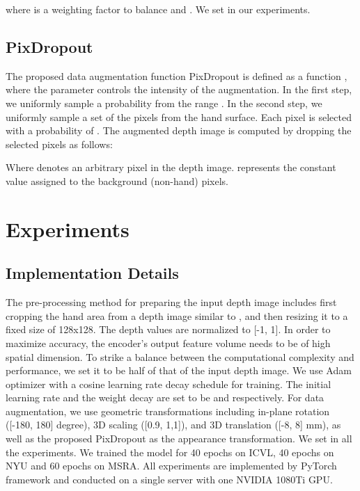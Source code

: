 \documentclass{article}
\begin{document}
where  is a weighting factor to balance  and . We set   in our experiments.

\subsection{PixDropout}
The proposed data augmentation function PixDropout is defined as a function , where the parameter  controls the intensity of the augmentation. In the first step, we uniformly sample a probability  from the range . In the second step, we uniformly sample a set of the pixels  from the hand surface. Each pixel is selected with a probability of . The augmented depth image  is computed by dropping the selected pixels as follows: 

Where  denotes an arbitrary pixel in the depth image.   represents the constant value assigned to the background (non-hand) pixels. 

\section{Experiments}
\subsection{Implementation Details}
The pre-processing method for preparing the input depth image includes first cropping the hand area from a depth image similar to \cite{oberweger2017deepprior++}, and then resizing it to a fixed size of 128x128. The depth values are normalized to [-1, 1]. In order to maximize accuracy, the encoder's output feature volume needs to be of high spatial dimension. To strike a balance between the computational complexity and performance, we set it to be half of that of the input depth image. We use Adam \cite{kingma2014adam} optimizer with a cosine learning rate decay schedule \cite{loshchilov2016sgdr} for training. The initial learning rate and the weight decay are set to be  and  respectively.  For data augmentation, we use geometric transformations including in-plane rotation ([-180, 180] degree), 3D scaling ([0.9, 1,1]), and 3D translation ([-8, 8] mm), as well as the proposed PixDropout as the appearance transformation. We set  in all the experiments. We trained the model for 40 epochs on ICVL, 40 epochs on NYU and 60 epochs on MSRA. All experiments are implemented by PyTorch framework \cite{paszke2019pytorch} and conducted on a single server with one NVIDIA 1080Ti GPU.
\end{document}
